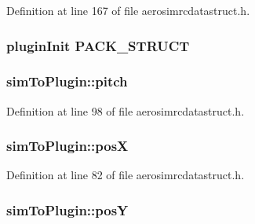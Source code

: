 Definition at line 167 of file aerosimrcdatastruct.\-h.

\hypertarget{group___aero_sim_r_c_gacc1a47760066283f765895e6100c5d81}{
\subsubsection[{P\-A\-C\-K\-\_\-\-S\-T\-R\-U\-C\-T}]{ {\bf plugin\-Init} P\-A\-C\-K\-\_\-\-S\-T\-R\-U\-C\-T}}\label{group___aero_sim_r_c_gacc1a47760066283f765895e6100c5d81}
\hypertarget{group___aero_sim_r_c_ga2ae727a3d4523188e3b7e5c664c22637}{
\subsubsection[{pitch}]{ sim\-To\-Plugin\-::pitch}}\label{group___aero_sim_r_c_ga2ae727a3d4523188e3b7e5c664c22637}


Definition at line 98 of file aerosimrcdatastruct.\-h.

\hypertarget{group___aero_sim_r_c_gadc6f34115ac3890af669c35382d62882}{
\subsubsection[{pos\-X}]{ sim\-To\-Plugin\-::pos\-X}}\label{group___aero_sim_r_c_gadc6f34115ac3890af669c35382d62882}


Definition at line 82 of file aerosimrcdatastruct.\-h.

\hypertarget{group___aero_sim_r_c_ga55c533e8057bdcc0bb7e95440eb82ff5}{
\subsubsection[{pos\-Y}]{ sim\-To\-Plugin\-::pos\-Y}}\label{group___aero_sim_r_c_ga55c533e8057bdcc0bb7e95440eb82ff5}



